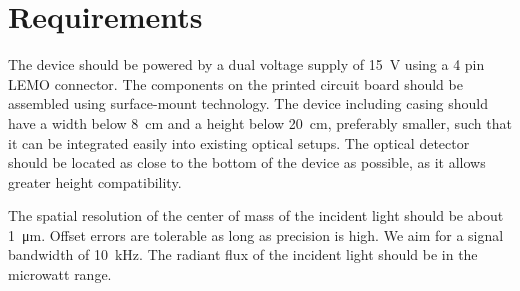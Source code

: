 \section{Requirements}


The device should be powered by a dual voltage supply of \SI{15}{\volt} using a 4 pin LEMO connector.
The components on the printed circuit board should be assembled using surface-mount technology.
The device including casing should have a width below \SI{8}{\centi\meter} and a height below \SI{20}{\centi\meter}, preferably smaller, such that it can be integrated easily into existing optical setups.
The optical detector should be located as close to the bottom of the device as possible, as it allows greater height compatibility.

The spatial resolution of the center of mass of the incident light should be about \SI{1}{\micro\meter}.
Offset errors are tolerable as long as precision is high.
We aim for a signal bandwidth of \SI{10}{\kilo\hertz}.
The radiant flux of the incident light should be in the microwatt range.